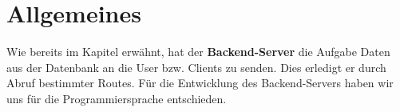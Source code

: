 \chapter{Allgemeines}

Wie bereits im Kapitel  erwähnt, hat der \textbf{Backend-Server} die Aufgabe
Daten aus der Datenbank an die User bzw. Clients zu senden. Dies erledigt er durch Abruf
bestimmter Routes. Für die Entwicklung des Backend-Servers haben wir uns für die Programmiersprache
\textit{} entschieden.




